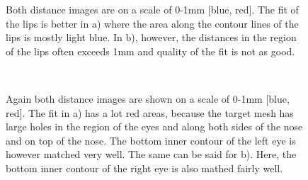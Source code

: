 \begin{figure}[h!]
    \centering
    \label{fig:distmaplips}
    \caption{Both distance images are on a scale of 0-1mm [blue, red]. The fit of the lips is better in a) where the area along the contour lines of the lips is mostly light blue. In b), however, the distances in the region of the lips often exceeds 1mm and quality of the fit is not as good.}
\end{figure}

\begin{figure}[h!]
    \centering
    \\
    \label{fig:distmapeyes}
    \caption{Again both distance images are shown on a scale of 0-1mm [blue, red]. The fit in a) has a lot red areas, because the target mesh has large holes in the region of the eyes and along both sides of the nose and on top of the nose. The bottom inner contour of the left eye is however matched very well. The same can be said for b). Here, the bottom inner contour of the right eye is also mathed fairly well.}
\end{figure}

